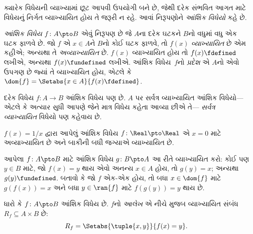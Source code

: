 \begingroup
\makeatletter{}\makeatother


\label{guunit:OLP-0026}


\begin{explain}
ક્યારેક વિધેયની વ્યાખ્યામાં છૂટ આપવી ઉપયોગી બને છે,
જેથી દરેક સંભવિત આગત માટે વિધેયનું નિર્ગત વ્યાખ્યાયિત
હોય તે જરૂરી ન રહે. આવાં નિરૂપણોને
\emph{આંશિક વિધેયો} કહે છે.
\end{explain}

\begin{defn}
\emph{આંશિક વિધેય} $f \colon A \pto B$ એવું નિરૂપણ છે
જે $A$ના દરેક ઘટકને $B$નો વધુમાં વધુ એક
ઘટક ફાળવે છે. જો $f$ એ $x \in A$ને $B$નો
કોઈ ઘટક ફાળવે, તો $f(x)$ \emph{વ્યાખ્યાયિત} છે
એમ કહીએ; અન્યથા તે \emph{અવ્યાખ્યાયિત} છે.
$f(x)$ વ્યાખ્યાયિત હોય તો $f(x) \fdefined$ લખીએ,
અન્યથા $f(x) \fundefined$ લખીએ. આંશિક વિધેય~$f$નો
\emph{પ્રદેશ} એ $A$નો એવો ઉપગણ છે જ્યાં તે
વ્યાખ્યાયિત હોય, એટલે કે
$\dom{f} = \Setabs{x \in A}{f(x) \fdefined}$.
\end{defn}

\begin{ex}
દરેક વિધેય $f\colon A \to B$ આંશિક વિધેય પણ છે.
$A$ પર સર્વત્ર વ્યાખ્યાયિત આંશિક વિધેયો---એટલે કે
અત્યાર સુધી આપણે જેને માત્ર વિધેય કહેતા આવ્યા છીએ તે---
\emph{સર્વત્ર વ્યાખ્યાયિત} વિધેયો પણ કહેવાય છે.
\end{ex}

\begin{ex}
$f(x) = 1/x$ દ્વારા આપેલું આંશિક વિધેય
$f \colon \Real \pto \Real$ એ $x = 0$ માટે
અવ્યાખ્યાયિત છે અને બાકીની બધી જગ્યાએ વ્યાખ્યાયિત છે.
\end{ex}

\begin{prob}
આપેલા $f\colon A \pto B$ માટે આંશિક વિધેય
$g\colon B \pto
A$ આ રીતે વ્યાખ્યાયિત કરો: કોઈ પણ $y \in B$ માટે,
જો $f(x) = y$ થાય એવો અનન્ય $x \in A$ હોય,
તો $g(y) = x$; અન્યથા $g(y) \fundefined$.
બતાવો કે જો $f$ એક-એક હોય, તો બધા $x \in \dom{f}$
માટે $g(f(x)) = x$ અને બધા $y \in \ran{f}$ માટે
$f(g(y)) = y$ થાય છે.
\end{prob}

\begin{defn}[આંશિક વિધેયનો આલેખ]
ધારો કે $f\colon A \pto B$ આંશિક વિધેય છે.
$f$નો \emph{આલેખ} એ નીચે મુજબ વ્યાખ્યાયિત સંબંધ
$R_f \subseteq A \times B$ છે:
\[
R_f = \Setabs{\tuple{x,y}}{f(x) = y}.
\]
\end{defn}

